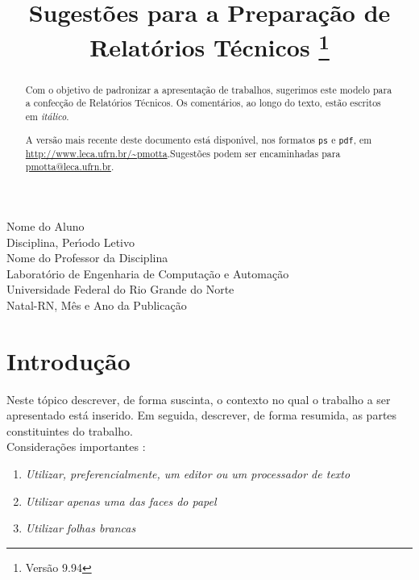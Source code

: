 \documentclass[a4paper,11pt]{article}
\title{Sugest{\~o}es para a Prepara{\c c}{\~a}o de Relat{\'o}rios T{\'e}cnicos
        \footnote{Vers{\~a}o 9.94}}
\author{}
\date{}
\begin{document}
\maketitle
\thispagestyle{empty}
\vspace{5cm}
\begin{minipage}{\textwidth}
\flushright
{\large
Nome do Aluno \\
Disciplina, Per{\'\i}odo Letivo\\
Nome do Professor da Disciplina\\}
\vspace{7cm}
\center
{\large
Laborat{\'o}rio de Engenharia de Computa{\c c}{\~a}o e Automa{\c c}{\~a}o\\
Universidade Federal do Rio Grande do Norte\\
Natal-RN, M{\^e}s e Ano da Publica{\c c}{\~a}o}
\end{minipage} 
\pagebreak 


\begin{abstract}
Com o objetivo de padronizar a apresenta{\c c}{\~a}o de trabalhos, sugerimos este modelo para a confec{\c c}{\~a}o de Relat{\'o}rios T{\'e}cnicos. Os coment{\'a}rios, ao longo do texto, est{\~a}o escritos em {\it it{\'a}lico}.

 A vers{\~a}o mais recente deste documento est{\'a} dispon{\'\i}vel, nos formatos {\tt ps} e {\tt pdf}, em \url{http://www.leca.ufrn.br/~pmotta}.Sugest{\~o}es podem ser encaminhadas para \url{pmotta@leca.ufrn.br}.
\end{abstract}
\pagebreak



\tableofcontents
\pagebreak


\section{Introdu{\c c}{\~a}o}
Neste t{\'o}pico descrever, de forma suscinta, o contexto no qual o trabalho a ser apresentado est{\'a} inserido. Em seguida, descrever, de forma resumida, as partes constituintes do trabalho.\\
Considera{\c c}{\~o}es importantes :
\begin{enumerate}
\item {\it Utilizar, preferencialmente, um editor ou um  processador de texto} 
\item {\it Utilizar apenas uma das faces do papel}
\item {\it Utilizar folhas brancas}
\end{enumerate}
\pagebreak
\end{document}
